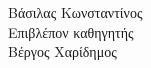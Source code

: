 \begin{titlepage}
	\vfill %

    \begin{center}
        Βάσιλας Κωνσταντίνος\\[1.5cm]
        
        Επιβλέπον καθηγητής\\
        Βέργος Χαρίδημος
    \end{center}
	 
	
	
\end{titlepage}




	

 	
 	
 	



	
